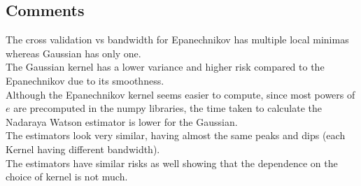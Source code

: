 \subsection{Comments}
The cross validation vs bandwidth for Epanechnikov has multiple local minimas whereas Gaussian has only one.\\
The Gaussian kernel has a lower variance and higher risk compared to the Epanechnikov due to its smoothness.\\
Although the Epanechnikov kernel seems easier to compute, since most powers of $e$ are precomputed in the numpy libraries, the time taken to calculate the Nadaraya Watson estimator is lower for the Gaussian.\\
The estimators look very similar, having almost the same peaks and dips (each Kernel having different bandwidth).\\
The estimators have similar risks as well showing that the dependence on the choice of kernel is not much.